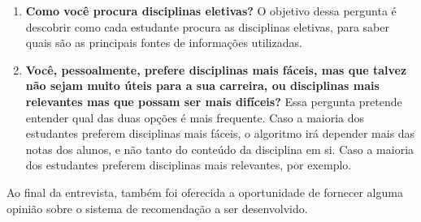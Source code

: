 \begin{enumerate}

    \item \textbf{Como você procura disciplinas eletivas?} O objetivo dessa pergunta é descobrir como cada estudante procura as disciplinas eletivas, para saber quais são as principais fontes de informações utilizadas.
        

    \item \textbf{Você, pessoalmente, prefere disciplinas mais fáceis, mas que talvez não sejam muito úteis para a sua carreira, ou disciplinas mais relevantes mas que possam ser mais difíceis?} Essa pergunta pretende entender qual das duas opções é mais frequente. Caso a maioria dos estudantes preferem disciplinas mais fáceis, o algoritmo irá depender mais das notas dos alunos, e não tanto do conteúdo da disciplina em si. Caso a maioria dos estudantes preferem disciplinas mais relevantes, por exemplo.
    

\end{enumerate}

Ao final da entrevista, também foi oferecida a oportunidade de fornecer alguma opinião sobre o sistema de recomendação a ser desenvolvido.

